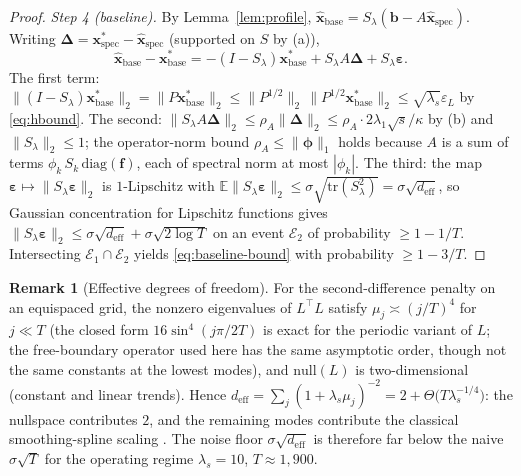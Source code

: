 \documentclass[10pt]{article} %
\theoremstyle{plain}
\theoremstyle{definition}
\newtheorem{remark}{Remark}
\begin{document}
\begin{proof}
\emph{Step 4 (baseline).} By Lemma~\ref{lem:profile},
$\hat{\mathbf{x}}_{\mathrm{base}}
= S_{\lambda}(\mathbf{b}-A\hat{\mathbf{x}}_{\mathrm{spec}})$.
Writing $\boldsymbol{\Delta} = \mathbf{x}^{*}_{\mathrm{spec}}
-\hat{\mathbf{x}}_{\mathrm{spec}}$ (supported on $S$ by (a)),
\begin{equation}
\hat{\mathbf{x}}_{\mathrm{base}} - \mathbf{x}^{*}_{\mathrm{base}}
= -(I-S_{\lambda})\mathbf{x}^{*}_{\mathrm{base}}
+ S_{\lambda} A \boldsymbol{\Delta}
+ S_{\lambda}\boldsymbol{\varepsilon}.
\end{equation}
The first term: $\|(I-S_{\lambda})\mathbf{x}^{*}_{\mathrm{base}}\|_{2}
= \|P\mathbf{x}^{*}_{\mathrm{base}}\|_{2}
\le \|P^{1/2}\|_{2}\,\|P^{1/2}\mathbf{x}^{*}_{\mathrm{base}}\|_{2}
\le \sqrt{\lambda_{s}}\varepsilon_{L}$ by \eqref{eq:hbound}. The
second: $\|S_{\lambda}A\boldsymbol{\Delta}\|_{2}
\le \rho_{A}\|\boldsymbol{\Delta}\|_{2}
\le \rho_{A}\cdot 2\lambda_{1}\sqrt{s}/\kappa$ by (b) and
$\|S_{\lambda}\|_{2}\le 1$; the operator-norm bound
$\rho_{A}\le\|\boldsymbol{\phi}\|_{1}$ holds because $A$ is a sum of
terms $\phi_{k}\,S_{k}\,\mathrm{diag}(\mathbf{f})$, each of spectral
norm at most $|\phi_{k}|$. The third: the map
$\boldsymbol{\varepsilon}\mapsto\|S_{\lambda}\boldsymbol{\varepsilon}\|_{2}$
is $1$-Lipschitz with
$\mathbb{E}\|S_{\lambda}\boldsymbol{\varepsilon}\|_{2}
\le \sigma\sqrt{\mathrm{tr}(S_{\lambda}^{2})}
= \sigma\sqrt{d_{\mathrm{eff}}}$, so Gaussian concentration for
Lipschitz functions \citep[Thm.~5.6]{BoucheronLugosiMassart2013}
gives $\|S_{\lambda}\boldsymbol{\varepsilon}\|_{2}
\le \sigma\sqrt{d_{\mathrm{eff}}} + \sigma\sqrt{2\log T}$ on an event
$\mathcal{E}_{2}$ of probability $\ge 1-1/T$. Intersecting
$\mathcal{E}_{1}\cap\mathcal{E}_{2}$ yields \eqref{eq:baseline-bound}
with probability $\ge 1-3/T$.
\end{proof}

\begin{remark}[Effective degrees of freedom]
For the second-difference penalty on an equispaced grid, the nonzero
eigenvalues of $L^{\top}L$ satisfy $\mu_{j} \asymp (j/T)^{4}$ for
$j \ll T$ (the closed form $16\sin^{4}(j\pi/2T)$ is exact for the
periodic variant of $L$; the free-boundary operator used here has the
same asymptotic order, though not the same constants at the lowest
modes), and $\mathrm{null}(L)$ is two-dimensional (constant and
linear trends). Hence
$d_{\mathrm{eff}} = \sum_{j}(1+\lambda_{s}\mu_{j})^{-2}
= 2 + \Theta\bigl(T\lambda_{s}^{-1/4}\bigr)$: the nullspace
contributes $2$, and the remaining modes contribute the classical
smoothing-spline scaling
\citep{GreenSilverman1994}. The noise floor
$\sigma\sqrt{d_{\mathrm{eff}}}$ is therefore far below the naive
$\sigma\sqrt{T}$ for the operating regime $\lambda_{s}=10$,
$T\approx 1{,}900$.
\end{remark}
\end{document}
